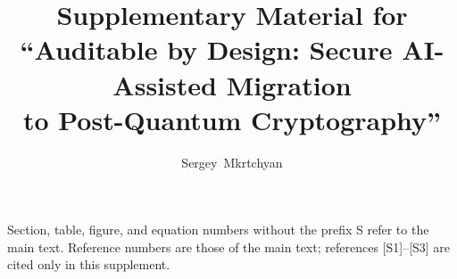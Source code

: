 \documentclass[journal]{IEEEtran}
\begin{document}
\title{Supplementary Material for\\ ``Auditable by Design: Secure AI-Assisted Migration\\ to Post-Quantum Cryptography''}
\author{Sergey~Mkrtchyan}
\maketitle
\noindent Section, table, figure, and equation numbers without the prefix S refer to the main text. Reference numbers are those of the main text; references [S1]--[S3] are cited only in this supplement.








\end{document}
